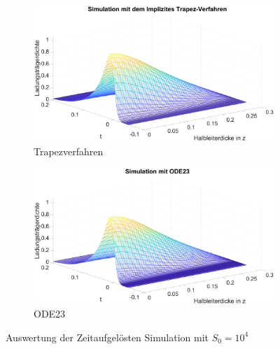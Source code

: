\begin{figure}
	\centering

\end{figure}
\begin{figure}
	\centering

\end{figure}

\begin{figure}[h]
	
	\begin{subfigure}[b]{0.5\textwidth}
			\includegraphics[width=1\linewidth]{figures/zeitaufgeloeste/S0}
		\caption{Trapezverfahren}
		\label{fig:s0}
	\end{subfigure}
	\hfill
	\begin{subfigure}[b]{0.5\textwidth}
			\includegraphics[width=1\linewidth]{figures/zeitaufgeloeste/S0_ode}
		\caption{ODE23}
		\label{fig:s0_ode}
	\end{subfigure}
	\caption{Auswertung der Zeitaufgelösten Simulation mit $S_0=10^4$ }
\end{figure}

\begin{figure}
	\centering

\end{figure}

